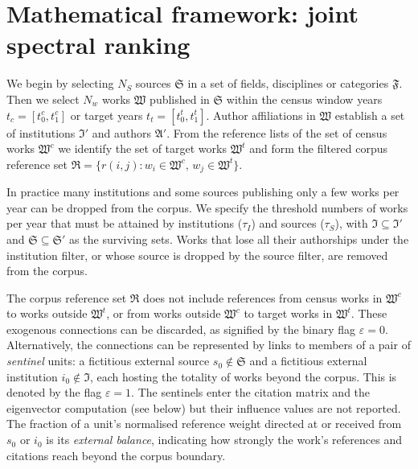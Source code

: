 \section{Mathematical framework: joint spectral ranking}
\label{sec:networks}

We begin by selecting $N_S$ sources $\mathfrak{S}$ in a set of fields, disciplines or categories $\mathfrak{F}$. Then we select $N_w$ works $\mathfrak{W}$ published in $\mathfrak{S}$ within the census
window years $t_c = [t^c_0, t^c_1]$ or target years $t_t = [t^t_0, t^t_1]$. Author affiliations in $\mathfrak{W}$ establish a set of institutions $\mathfrak{I}'$ and
authors $\mathfrak{A}'$. From the reference lists of the set of census works $\mathfrak{W}^c$ we identify the set of target works $\mathfrak{W}^t$ and form the filtered corpus reference set
$\mathfrak{R}=\{r(i,j):w_i\in\mathfrak{W}^c,\,w_j\in\mathfrak{W}^t\}$.

In practice many institutions and some sources publishing only
a few works per year can be dropped from the corpus. We specify 
the threshold numbers of works per year that must be attained by institutions ($\tau_I$) and sources ($\tau_S$), with $\mathfrak{I}\subseteq\mathfrak{I}'$ and $\mathfrak{S}\subseteq\mathfrak{S}'$ as the surviving sets. Works that lose all their authorships under the institution filter, or whose source is dropped by the source filter, are removed from the corpus. 

The corpus reference set $\mathfrak{R}$ does not include references from census works in $\mathfrak{W}^c$ to works outside $\mathfrak{W}^t$, or from works outside $\mathfrak{W}^c$ to target works in $\mathfrak{W}^t$. These exogenous connections can be discarded, as signified by the binary flag $\varepsilon=0$. Alternatively, the connections can be represented by links to members of a pair of \emph{sentinel} units: a fictitious external source $s_0\notin\mathfrak{S}$ and a fictitious external institution $i_0\notin\mathfrak{I}$, each hosting the totality of works beyond the corpus. This is denoted by the flag $\varepsilon = 1$. The sentinels enter the citation matrix and the eigenvector computation (see below) but their influence values are not reported. The fraction of a unit's normalised reference weight directed at or received from $s_0$ or $i_0$ is its \emph{external balance}, indicating how strongly the work's references and citations reach beyond the corpus boundary.

